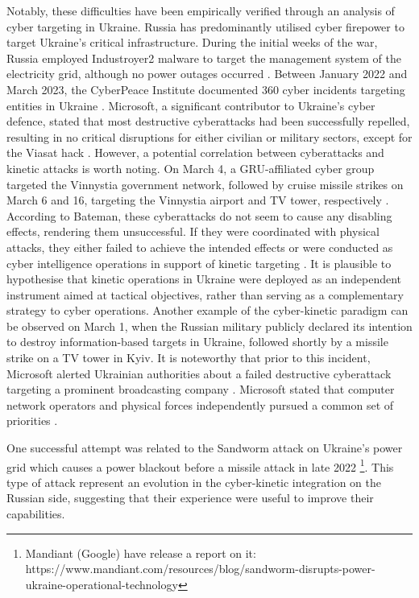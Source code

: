 Notably, these difficulties have been empirically verified through an analysis of cyber targeting in Ukraine. Russia has predominantly utilised cyber firepower to target Ukraine's critical infrastructure. During the initial weeks of the war, Russia employed Industroyer2 malware to target the management system of the electricity grid, although no power outages occurred \textcite{willett_2022_the}. Between January 2022 and March 2023, the CyberPeace Institute documented 360 cyber incidents targeting entities in Ukraine \autocite[3a]{cyberpeaceinstitute_2023_cyber}. Microsoft, a significant contributor to Ukraine's cyber defence, stated that most destructive cyberattacks had been successfully repelled, resulting in no critical disruptions for either civilian or military sectors, except for the Viasat hack \autocite{smith_2022_defending}. However, a potential correlation between cyberattacks and kinetic attacks is worth noting. On March 4, a GRU-affiliated cyber group targeted the Vinnystia government network, followed by cruise missile strikes on March 6 and 16, targeting the Vinnystia airport and TV tower, respectively \autocite[8]{smith_2022_defending}. According to Bateman, these cyberattacks do not seem to cause any disabling effects, rendering them unsuccessful. If they were coordinated with physical attacks, they either failed to achieve the intended effects or were conducted as cyber intelligence operations in support of kinetic targeting \autocite[9]{baetman_2022_russias}. It is plausible to hypothesise that kinetic operations in Ukraine were deployed as an independent instrument aimed at tactical objectives, rather than serving as a complementary strategy to cyber operations. Another example of the cyber-kinetic paradigm can be observed on March 1, when the Russian military publicly declared its intention to destroy information-based targets in Ukraine, followed shortly by a missile strike on a TV tower in Kyiv. It is noteworthy that prior to this incident, Microsoft alerted Ukrainian authorities about a failed destructive cyberattack targeting a prominent broadcasting company \parencite{baetman_2022_russias, smith_2022_defending}. Microsoft stated that computer network operators and physical forces independently pursued a common set of priorities \autocite{microsoft_2022_an}. 

One successful attempt was related to the Sandworm attack on Ukraine's power grid which causes a power blackout before a missile attack in late 2022 \footnote{Mandiant (Google) have release a report on it: https://www.mandiant.com/resources/blog/sandworm-disrupts-power-ukraine-operational-technology}. This type of attack represent an evolution in the cyber-kinetic integration on the Russian side, suggesting that their experience were useful to improve their capabilities. 

